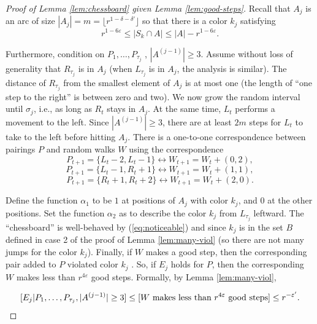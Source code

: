 \documentclass[10pt,a4paper]{article}
\theoremstyle{definition}%
\theoremstyle{plain}
\let\Pr\relax
\DeclareMathOperator*{\Pr}{\mathbb{P}}
\newcommand{\eps}{\varepsilon}
\begin{document}
\begin{proof}[Proof of Lemma \ref{lem:chessboard} given Lemma \ref{lem:good-steps}]
    Recall that $A_j$ is an arc of size $|A_j| = m = \lfloor r^{1-\delta - \delta'}\rfloor$
 so that there is a color
$k_j$ satisfying
\begin{equation}\label{eq:noticeable}
r^{1-6\eps} \leq |S_{k}\cap A| \leq 
|A| - r^{1-6\eps}.
\end{equation}

Furthermore, condition on $P_1, \ldots, P_{\tau_j}$
, $|A^{(j-1)}| \geq 3$. Assume without loss of generality that $R_{\tau_j}$
is in $A_j$ (when $L_{\tau_j}$
is
in $A_j$, the analysis is similar). The distance of $R_{\tau_j}$
from the smallest element of $A_j$ is at most one
(the length of “one step to the right” is between zero and two). We now grow the random interval
until $\sigma_j$, i.e., as long as $R_t$ stays in $A_j$. At the same time, $L_t$ performs a movement to the left.
Since $|A^{(j-1)}| \geq 3$, there are at least $2m$ steps for $L_t$ to take to the left before hitting $A_j$.
There is a one-to-one correspondence between pairings $P$ and random walks $W$ using the correspondence
\[
P_{t+1} = \{L_t - 2, L_t - 1\} \longleftrightarrow W_{t+1} = W_t + (0, 2),
\]
\[
P_{t+1} = \{L_t - 1, R_t + 1\} \longleftrightarrow W_{t+1} = W_t + (1, 1), \]
\[
P_{t+1} = \{R_t + 1, R_t + 2\} \longleftrightarrow W_{t+1} = W_t + (2, 0).
\]

Define the function $\alpha_1$ to be $1$ at positions of $A_j$ with color $k_j$, and $0$ at the other positions. Set
the function $\alpha_2$ as to describe the color $k_j$ from $L_{\tau_j}$
leftward. The “chessboard” is well-behaved by
(\ref{eq:noticeable}) and since $k_j$ is in the set $B$ defined in case 2 of the proof of Lemma \ref{lem:many-viol} (so there are not many
jumps for the color $k_j$).
Finally, if $W$ makes a good step, then the corresponding pair added to $P$ violated color $k_j$ .
So, if $E_j$ holds for $P$, then the corresponding $W$ makes less than $r^{4\eps}$ good steps. Formally, by
Lemma \ref{lem:many-viol},

\[
\Pr[E_j|P_1,\ldots, P_{\tau_j}, |A^{(j-1)}| \geq 3]\leq \Pr[\text{$W$ makes less than $r^{4\eps}$ good steps}] \leq r^{-\eps'}.
\]
\end{proof}
\end{document}
